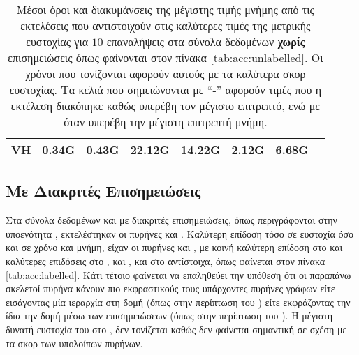 \begin{table}[]
\begin{adjustbox}{angle=90}
{{\begin{tabular}{|l|c|c|c|c|c|c|c|}
VH              &           0.34G &          0.43G &           22.12G &           14.22G &           2.12G &           6.68G \\\hline
\end{tabular}
}
}
\end{adjustbox}
\caption[Μέσοι όροι και διακυμάνσεις της μέγιστης τιμής μνήμης από τις εκτελέσεις που αντιστοιχούν στις καλύτερες τιμές της μετρικής ευστοχίας για $10$ επαναλήψεις  στα σύνολα δεδομένων χωρίς επισημειώσεις.]{\small Μέσοι όροι και διακυμάνσεις της μέγιστης τιμής μνήμης από τις εκτελέσεις που αντιστοιχούν στις καλύτερες τιμές της μετρικής ευστοχίας για $10$ επαναλήψεις  στα σύνολα δεδομένων \textbf{χωρίς} επισημειώσεις όπως φαίνονται στον πίνακα \ref{tab:acc:unlabelled}. Οι χρόνοι που τονίζονται αφορούν αυτούς με τα καλύτερα σκορ ευστοχίας. Τα κελιά που σημειώνονται με ``-'' αφορούν τιμές που η εκτέλεση διακόπηκε καθώς υπερέβη τον μέγιστο επιτρεπτό, ενώ με  όταν υπερέβη την μέγιστη επιτρεπτή μνήμη.}
\label{tab:mem:unlabelled}
\end{table}


\subsection{Με Διακριτές Επισημειώσεις}
Στα σύνολα δεδομένων  και  με διακριτές επισημειώσεις, όπως περιγράφονται στην υποενότητα \label{ssec:lab}, εκτελέστηκαν οι πυρήνες  και .
Καλύτερη επίδοση τόσο σε ευστοχία όσο και σε χρόνο και μνήμη, είχαν οι πυρήνες  και , με κοινή καλύτερη επίδοση στο  και καλύτερες επιδόσεις στο ,  και , και στο  αντίστοιχα, όπως φαίνεται στον πίνακα \ref{tab:acc:labelled}.
Κάτι τέτοιο φαίνεται να επαληθεύει την υπόθεση ότι οι παραπάνω σκελετοί πυρήνα κάνουν πιο εκφραστικούς τους υπάρχοντες πυρήνες γράφων είτε εισάγοντας μία ιεραρχία στη δομή (όπως στην περίπτωση του ) είτε εκφράζοντας την ίδια την δομή μέσω των επισημειώσεων (όπως στην περίπτωση του ).
Η μέγιστη δυνατή ευστοχία του  στο , δεν τονίζεται καθώς δεν φαίνεται σημαντική σε σχέση με τα σκορ των υπολοίπων πυρήνων.

